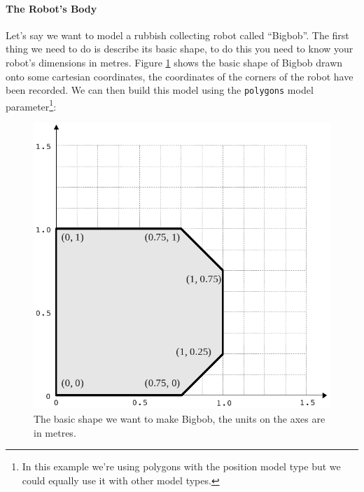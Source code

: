 \documentclass[a4paper]{report}
\begin{document}
\paragraph{The Robot's Body}
Let's say we want to model a rubbish collecting robot called ``Bigbob''. The first thing we need to do is describe its basic shape, to do this you need to know your robot's dimensions in metres. Figure \ref{fig:basicbigbob} shows the basic shape of Bigbob drawn onto some cartesian coordinates, the coordinates of the corners of the robot have been recorded. We can then build this model using the \verb|polygons| model parameter\footnote{In this example we're using polygons with the position model type but we could equally use it with other model types.}:
\begin{figure}
	\centering
	\includegraphics[width=0.7\linewidth]{./pics/robot_building/bigbob1.png} 
	\caption{The basic shape we want to make Bigbob, the units on the axes are in metres.}
	\label{fig:basicbigbob}
\end{figure}
\end{document}
